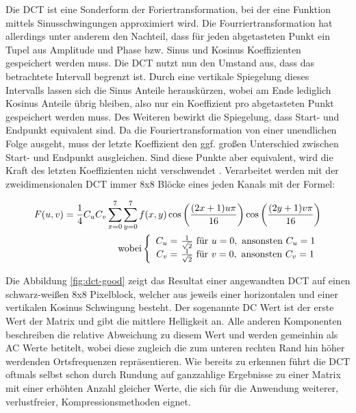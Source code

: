 Die DCT ist eine Sonderform der Foriertransformation, bei der eine Funktion mittels Sinusschwingungen approximiert wird. Die Fourriertransformation hat allerdings unter anderem den Nachteil, dass für jeden abgetasteten Punkt ein Tupel aus Amplitude und Phase bzw. Sinus und Kosinus Koeffizienten gespeichert werden muss. Die DCT nutzt nun den Umstand aus, dass das betrachtete Intervall begrenzt ist. Durch eine vertikale Spiegelung dieses Intervalls lassen sich die Sinus Anteile herauskürzen, wobei am Ende lediglich Kosinus Anteile übrig bleiben, also nur ein Koeffizient pro abgetasteten Punkt gespeichert werden muss. Des Weiteren bewirkt die Spiegelung, dass Start- und Endpunkt equivalent sind. Da die Fouriertransformation von einer unendlichen Folge ausgeht, muss der letzte Koeffizient den ggf. großen Unterschied zwischen Start- und Endpunkt ausgleichen. Sind diese Punkte aber equivalent, wird die Kraft des letzten Koeffizienten nicht verschwendet \cite{symes_peter_digital_2004}. Verarbeitet werden mit der zweidimensionalen DCT immer 8x8 Blöcke eines jeden Kanals mit der Formel:

\thickmuskip
\begin{align*}
  F(u,v) = \frac{1}{4} C_uC_v\sum_{x=0}^7 \sum_{y=0}^7 f(x,y) \cos \left(\frac{(2x+1)u\pi}{16}\right) \cos\left(\frac{(2y+1)v\pi}{16}\right) \\
  \text{wobei} \left\lbrace
  \begin{array}{r@{}l}
	C_u = & \text{ } \frac{1}{\sqrt{2}} \text{ für } u=0, \text{ ansonsten } C_u=1\\
	C_v = & \text{ } \frac{1}{\sqrt{2}} \text{ für } v=0, \text{ ansonsten } C_v=1
  \end{array}
  \right.
\end{align*}

Die Abbildung \ref{fig:dct-good} zeigt das Resultat einer angewandten DCT auf einen schwarz-weißen 8x8 Pixelblock, welcher aus jeweils einer horizontalen und einer vertikalen Kosinus Schwingung besteht. Der sogenannte DC Wert ist der erste Wert der Matrix und gibt die mittlere Helligkeit an. Alle anderen Komponenten beschreiben die relative Abweichung zu diesem Wert und werden gemeinhin als AC Werte betitelt, wobei diese zugleich die zum unteren rechten Rand hin höher werdenden Ortsfrequenzen repräsentieren. Wie bereits zu erkennen führt die DCT oftmals selbst schon durch Rundung auf ganzzahlige Ergebnisse zu einer Matrix mit einer erhöhten Anzahl gleicher Werte, die sich für die Anwendung weiterer, verlustfreier, Kompressionsmethoden eignet.

